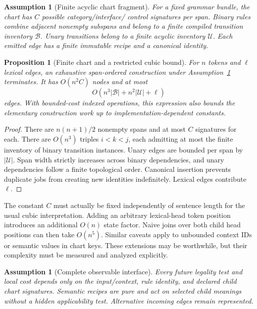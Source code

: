 \documentclass[11pt,a4paper]{article}
\newtheorem{proposition}[definition]{Proposition}
\newtheorem{assumption}[definition]{Assumption}
\begin{document}
\begin{assumption}[Finite acyclic chart fragment]\label{assump:finite}
For a fixed grammar bundle, the chart has \(C\) possible category/interface/
control signatures per span. Binary rules combine adjacent nonempty
subspans and belong to a finite compiled transition inventory \(\mathcal B\).
Unary transitions belong to a finite acyclic inventory \(\mathcal U\).
Each emitted edge has a finite immutable recipe and a canonical identity.
\end{assumption}

\begin{proposition}[Finite chart and a restricted cubic bound]
For \(n\) tokens and \(\ell\) lexical edges, an exhaustive span-ordered
construction under Assumption~\ref{assump:finite} terminates. It has
\(O(n^2 C)\) nodes and at most
\[
 O\!\left(n^3|\mathcal B|+n^2|\mathcal U|+\ell\right)
\]
edges. With bounded-cost indexed operations, this expression also bounds
the elementary construction work up to implementation-dependent constants.
\end{proposition}
\begin{proof}
There are \(n(n+1)/2\) nonempty spans and at most \(C\) signatures for
each. There are \(O(n^3)\) triples \(i<k<j\), each admitting at most the
finite inventory of binary transition instances. Unary edges are bounded
per span by \(|\mathcal U|\). Span width strictly increases across binary
dependencies, and unary dependencies follow a finite topological order.
Canonical insertion prevents duplicate jobs from creating new identities
indefinitely. Lexical edges contribute \(\ell\).
\end{proof}

The constant \(C\) must actually be fixed independently of sentence length
for the usual cubic interpretation. Adding an arbitrary lexical-head token
position introduces an additional \(O(n)\) state factor. Naive joins over
both child head positions can then take \(O(n^5)\). Similar caveats apply to
unbounded context IDs or semantic values in chart keys. These extensions may
be worthwhile, but their complexity must be measured and analyzed explicitly.

\begin{assumption}[Complete observable interface]\label{assump:interface}
Every future legality test and local cost depends only on the input/context,
rule identity, and declared child chart signatures. Semantic recipes are pure
and act on selected child meanings without a hidden applicability test.
Alternative incoming edges remain represented.
\end{assumption}
\end{document}
